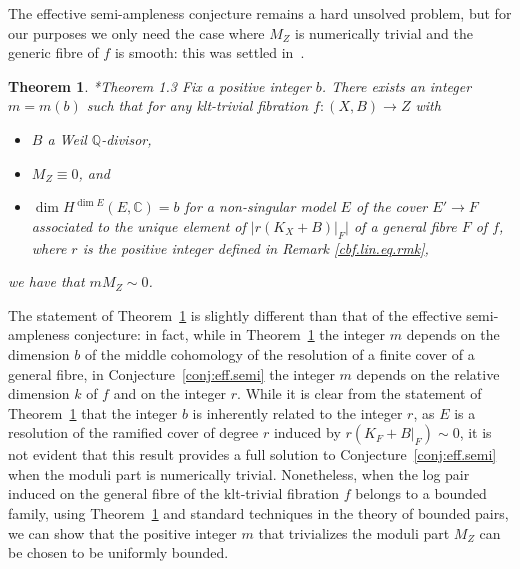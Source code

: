 \documentclass[11pt]{ip-journal}
\newtheorem{theorem}{Theorem}[section]
\theoremstyle{definition}
\begin{document}
The effective semi-ampleness conjecture remains a hard unsolved problem, but for our purposes we only need the case where $M_Z$ is numerically trivial and the generic fibre of $f$ is smooth: this was settled in~\cite{MR3180598}.

\begin{theorem}
\label{flor.thm}
\cite{MR3180598}*{Theorem 1.3}
Fix a positive integer $b$.
There exists an integer $m=m(b)$ such that for any klt-trivial fibration $f\colon (X, B)\rightarrow Z$ with
\begin{itemize}
\item 
$B$ a Weil $\mathbb{Q}$-divisor,

\item 
$M_Z\equiv 0$, and

\item 
$\dim H^{\dim E}(E,\mathbb{C})=b$ for a non-singular model $E$ of the cover $E'\rightarrow F$ associated to the unique element of $|r(K_X+B)|_F |$ of a general fibre $F$ of $f$, where $r$ is the positive integer defined in Remark \ref{cbf.lin.eq.rmk},
\end{itemize}

we have that $mM_Z\sim 0$.
\end{theorem}

The statement of Theorem~\ref{flor.thm} is slightly different than that of the effective semi-ampleness conjecture: 
in fact, while in Theorem~\ref{flor.thm} the integer 
$m$ 
depends on the dimension 
$b$ 
of the middle cohomology of the resolution of a finite cover of a general fibre, in Conjecture~\ref{conj:eff.semi} the integer 
$m$ 
depends on the relative dimension 
$k$ 
of 
$f$ 
and on the integer 
$r$.
While it is clear from the statement of Theorem~\ref{flor.thm} that the integer 
$b$ 
is inherently related to the integer 
$r$, 
as 
$E$ 
is a resolution of the ramified cover of degree 
$r$ 
induced by 
$r(K_F+B\vert_F) \sim 0$, 
it is not evident that this result provides a full solution to Conjecture~\ref{conj:eff.semi} when the moduli part is numerically trivial.
Nonetheless, when the log pair induced on the general fibre of the klt-trivial fibration 
$f$ 
belongs to a bounded family, using Theorem~\ref{flor.thm} and standard techniques in the theory of bounded pairs, we can show that the positive integer 
$m$ 
that trivializes the moduli part 
$M_Z$ 
can be chosen to be uniformly bounded.
\end{document}
